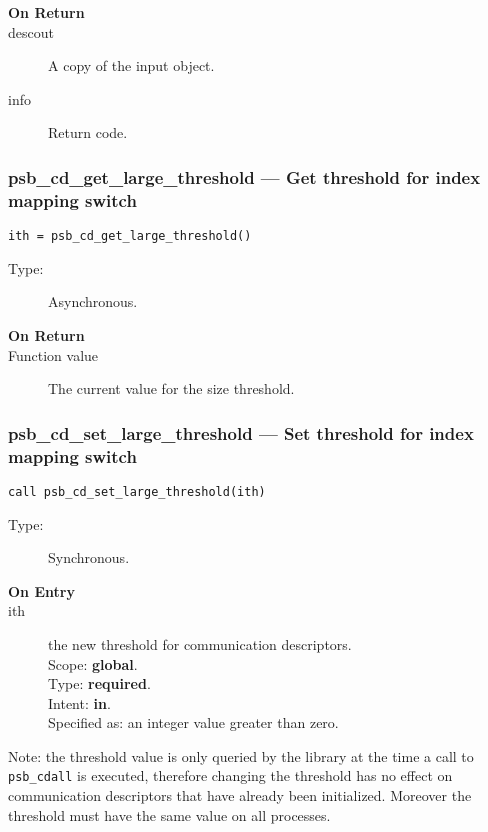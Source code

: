 \begin{description}
\item[\bf On Return]
\item[descout] A copy of the input object.
\item[info] Return code. 
\end{description}


\subsubsection*{psb\_cd\_get\_large\_threshold --- Get threshold for
  index mapping switch}

\begin{verbatim}
ith = psb_cd_get_large_threshold()
\end{verbatim}

\begin{description}
\item[Type:] Asynchronous.
\item[\bf On Return]
\item[Function value] The current value for the size threshold. 

\end{description}



\subsubsection*{psb\_cd\_set\_large\_threshold --- Set threshold for
  index mapping switch}

\begin{verbatim}
call psb_cd_set_large_threshold(ith)
\end{verbatim}

\begin{description}
\item[Type:] Synchronous.
\item[\bf On Entry]
\item[ith] the new threshold for communication descriptors.\\
Scope: {\bf global}.\\
Type: {\bf required}.\\
Intent: {\bf in}.\\
Specified as: an integer value greater than zero.
\end{description}
Note: the threshold value is only queried by the library at the time a
call to \verb|psb_cdall| is executed, therefore changing the threshold
has no effect on communication descriptors that have already been
initialized. Moreover the threshold must have the same value on all
processes. 


